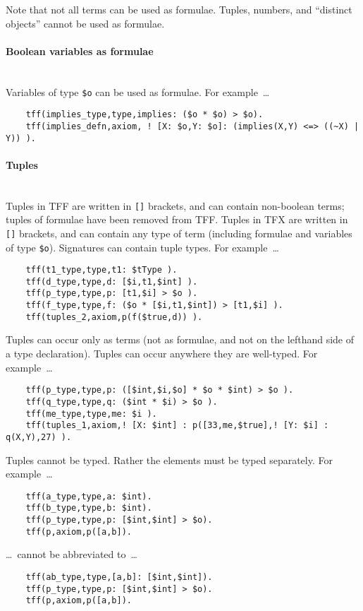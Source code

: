 \documentclass{easychair}
\begin{document}
Note that not all terms can be used as formulae.
Tuples, numbers, and ``distinct objects'' cannot be used as formulae.

\paragraph{Boolean variables as formulae}~\\
Variables of type {\tt \$o} can be used as formulae. For example~\ldots
\begin{verbatim}
    tff(implies_type,type,implies: ($o * $o) > $o).
    tff(implies_defn,axiom, ! [X: $o,Y: $o]: (implies(X,Y) <=> ((~X) | Y)) ).
\end{verbatim}

\paragraph{Tuples}~\\
Tuples in TFF are written in {\tt []} brackets, and can contain non-boolean 
terms; tuples of formulae have been removed from TFF. 
Tuples in TFX are written in {\tt []} brackets, and can contain any type of 
term (including formulae and variables of type {\tt \$o}). 
Signatures can contain tuple types. 
For example~\ldots
\begin{verbatim}
    tff(t1_type,type,t1: $tType ).
    tff(d_type,type,d: [$i,t1,$int] ).
    tff(p_type,type,p: [t1,$i] > $o ).
    tff(f_type,type,f: ($o * [$i,t1,$int]) > [t1,$i] ).
    tff(tuples_2,axiom,p(f($true,d)) ).
\end{verbatim}
Tuples can occur only as terms (not as formulae, and not on the lefthand side 
of a type declaration). 
Tuples can occur anywhere they are well-typed. For example~\ldots
\begin{verbatim}
    tff(p_type,type,p: ([$int,$i,$o] * $o * $int) > $o ).
    tff(q_type,type,q: ($int * $i) > $o ).
    tff(me_type,type,me: $i ).
    tff(tuples_1,axiom,! [X: $int] : p([33,me,$true],! [Y: $i] : q(X,Y),27) ).
\end{verbatim}
Tuples cannot be typed. Rather the elements must be typed separately. 
For example~\ldots
\begin{verbatim}
    tff(a_type,type,a: $int).
    tff(b_type,type,b: $int).
    tff(p_type,type,p: [$int,$int] > $o).
    tff(p,axiom,p([a,b]).
\end{verbatim}
\ldots~cannot be abbreviated to~\ldots
\begin{verbatim}
    tff(ab_type,type,[a,b]: [$int,$int]).
    tff(p_type,type,p: [$int,$int] > $o).
    tff(p,axiom,p([a,b]).
\end{verbatim}
\end{document}
